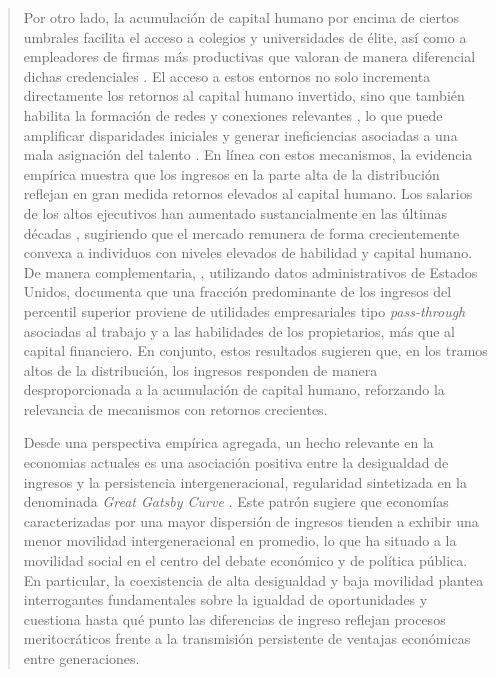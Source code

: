 \documentclass[12pt]{article}
\begin{document}
\begin{abstract}
Por otro lado, la acumulación de capital humano por encima de ciertos umbrales facilita el acceso a colegios y universidades de élite, así como a empleadores de firmas más productivas que valoran de manera diferencial dichas credenciales \parencite{Zimmerman_2019,Chetty_2025}. El acceso a estos entornos no solo incrementa directamente los retornos al capital humano invertido, sino que también habilita la formación de redes y conexiones relevantes \parencite{Bavaro_2022}, lo que puede amplificar disparidades iniciales y generar ineficiencias asociadas a una mala asignación del talento \parencite{Bandyopadhyay_2019}.
En línea con estos mecanismos, la evidencia empírica muestra que los ingresos en la parte alta de la distribución reflejan en gran medida retornos elevados al capital humano. Los salarios de los altos ejecutivos han aumentado sustancialmente en las últimas décadas \parencite{Gabaix_2008}, sugiriendo que el mercado remunera de forma crecientemente convexa a individuos con niveles elevados de habilidad y capital humano. De manera complementaria, \textcite{Smith_2019}, utilizando datos administrativos de Estados Unidos, documenta que una fracción predominante de los ingresos del percentil superior proviene de utilidades empresariales tipo \emph{pass-through} asociadas al trabajo y a las habilidades de los propietarios, más que al capital financiero. En conjunto, estos resultados sugieren que, en los tramos altos de la distribución, los ingresos responden de manera desproporcionada a la acumulación de capital humano, reforzando la relevancia de mecanismos con retornos crecientes.

Desde una perspectiva empírica agregada, un hecho relevante en la economias actuales es una asociación positiva entre la desigualdad de ingresos y la persistencia intergeneracional, regularidad sintetizada en la denominada \emph{Great Gatsby Curve} \parencite{Corak_2013}. Este patrón sugiere que economías caracterizadas por una mayor dispersión de ingresos tienden a exhibir una menor movilidad intergeneracional en promedio, lo que ha situado a la movilidad social en el centro del debate económico y de política pública. En particular, la coexistencia de alta desigualdad y baja movilidad plantea interrogantes fundamentales sobre la igualdad de oportunidades y cuestiona hasta qué punto las diferencias de ingreso reflejan procesos meritocráticos frente a la transmisión persistente de ventajas económicas entre generaciones.


\end{abstract}
\end{document}
